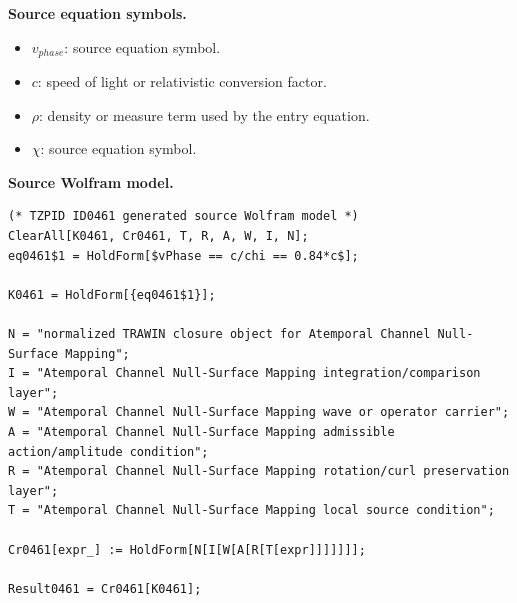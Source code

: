 \begin{minipage}[t]{0.49\linewidth}
\begingroup
\small
\raggedright
\textbf{Source equation symbols.}\par
\begin{itemize}[leftmargin=1.35em,itemsep=1pt,topsep=1pt,parsep=0pt]
    \item $v_{phase}$: source equation symbol.
    \item $c$: speed of light or relativistic conversion factor.
    \item $\rho$: density or measure term used by the entry equation.
    \item $\chi$: source equation symbol.
\end{itemize}
\endgroup
\end{minipage}\hfill
\begin{minipage}[t]{0.47\linewidth}
\begingroup
\scriptsize
\raggedright
\textbf{Source Wolfram model.}\par
\begin{Verbatim}[fontsize=\tiny,breaklines=true,breakanywhere=true]
(* TZPID ID0461 generated source Wolfram model *)
ClearAll[K0461, Cr0461, T, R, A, W, I, N];
eq0461$1 = HoldForm[$vPhase == c/chi == 0.84*c$];

K0461 = HoldForm[{eq0461$1}];

N = "normalized TRAWIN closure object for Atemporal Channel Null-Surface Mapping";
I = "Atemporal Channel Null-Surface Mapping integration/comparison layer";
W = "Atemporal Channel Null-Surface Mapping wave or operator carrier";
A = "Atemporal Channel Null-Surface Mapping admissible action/amplitude condition";
R = "Atemporal Channel Null-Surface Mapping rotation/curl preservation layer";
T = "Atemporal Channel Null-Surface Mapping local source condition";

Cr0461[expr_] := HoldForm[N[I[W[A[R[T[expr]]]]]]];

Result0461 = Cr0461[K0461];
\end{Verbatim}
\endgroup
\end{minipage}

